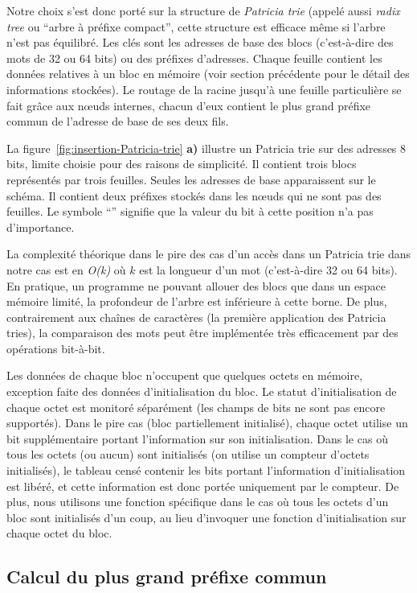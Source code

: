 Notre choix s'est donc porté sur la structure de {\em Patricia trie}
\cite{Szpankowski/90} (appelé aussi {\em radix tree} ou ``arbre à préfixe
compact'', cette structure est efficace même si l'arbre n'est pas équilibré.
Les clés sont les adresses de base des blocs (c'est-à-dire des mots de 32 ou 64
bits) ou des préfixes d'adresses.
Chaque feuille contient les données relatives à un bloc en mémoire (voir
section précédente pour le détail des informations stockées).
Le routage de la racine jusqu'à une feuille particulière se fait grâce aux
n\oe{}uds internes, chacun d'eux contient le plus grand préfixe commun de
l'adresse de base de ses deux fils.

La figure~\ref{fig:insertion-Patricia-trie} \textbf{a)} illustre un Patricia
trie sur des adresses 8 bits, limite choisie pour des raisons de simplicité.
Il contient trois blocs représentés par trois feuilles.
Seules les adresses de base apparaissent sur le schéma.
Il contient deux préfixes stockés dans les n\oe{}uds qui ne sont pas des
feuilles.
Le symbole ``{\tt *}'' signifie que la valeur du bit à cette position n'a pas
d'importance.

La complexité théorique dans le pire des cas d'un accès dans un Patricia trie
dans notre cas est en {\em O(k)} où $k$ est la longueur d'un mot (c'est-à-dire
32 ou 64 bits).
En pratique, un programme ne pouvant allouer des blocs que dans un
espace mémoire limité, la profondeur de l'arbre est inférieure à cette borne.
De plus, contrairement aux chaînes de caractères (la première application des
Patricia tries), la comparaison des mots peut être implémentée très
efficacement par des opérations bit-à-bit.

Les données de chaque bloc n'occupent que quelques octets en mémoire, exception
faite des données d'initialisation du bloc.
Le statut d'initialisation de chaque octet est monitoré séparément (les champs
de bits ne sont pas encore supportés).
Dans le pire cas (bloc partiellement initialisé), chaque octet utilise un bit
supplémentaire portant l'information sur son initialisation.
Dans le cas où tous les octets (ou aucun) sont initialisés (on utilise un
compteur d'octets initialisés), le tableau censé contenir les bits portant
l'information d'initialisation est libéré, et cette information est donc portée
uniquement par le compteur.
De plus, nous utilisons une fonction spécifique dans le cas où tous les octets
d'un bloc sont initialisés d'un coup, au lieu d'invoquer une fonction
d'initialisation sur chaque octet du bloc.


\subsection{Calcul du plus grand préfixe commun}


